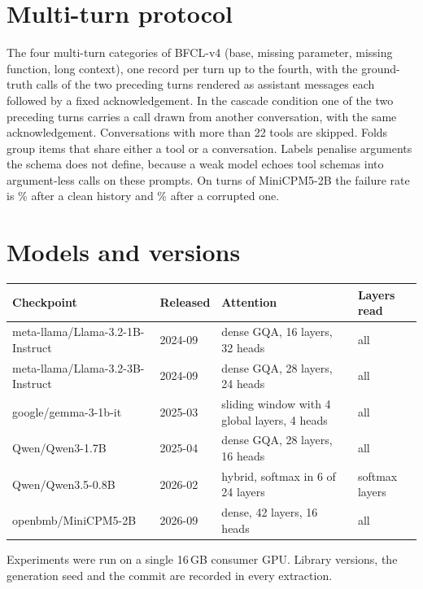 \section{Multi-turn protocol}
\label{app:multiturn}

The four multi-turn categories of BFCL-v4 (base, missing parameter, missing function, long context), one record per turn up to the fourth, with the ground-truth calls of the two preceding turns rendered as assistant messages each followed by a fixed acknowledgement. In the cascade condition one of the two preceding turns carries a call drawn from another conversation, with the same acknowledgement. Conversations with more than 22 tools are skipped. Folds group items that share either a tool or a conversation. Labels penalise arguments the schema does not define, because a weak model echoes tool schemas into argument-less calls on these prompts. On \mtN{} turns of MiniCPM5-2B the failure rate is \mtFailClean{}\% after a clean history and \mtFailCorrupt{}\% after a corrupted one.

\section{Models and versions}
\label{app:models}

\begin{center}\small
\begin{tabular}{llll}
\toprule
Checkpoint & Released & Attention & Layers read \\
\midrule
meta-llama/Llama-3.2-1B-Instruct & 2024-09 & dense GQA, 16 layers, 32 heads & all \\
meta-llama/Llama-3.2-3B-Instruct & 2024-09 & dense GQA, 28 layers, 24 heads & all \\
google/gemma-3-1b-it & 2025-03 & sliding window with 4 global layers, 4 heads & all \\
Qwen/Qwen3-1.7B & 2025-04 & dense GQA, 28 layers, 16 heads & all \\
Qwen/Qwen3.5-0.8B & 2026-02 & hybrid, softmax in 6 of 24 layers & softmax layers \\
openbmb/MiniCPM5-2B & 2026-09 & dense, 42 layers, 16 heads & all \\
\bottomrule
\end{tabular}
\end{center}

Experiments were run on a single 16\,GB consumer GPU. Library versions, the generation seed and the commit are recorded in every extraction.
